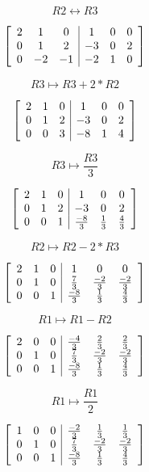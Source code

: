 \documentclass[lineaire_algebra_oplossingen.tex]{subfiles}
\begin{document}
\[R2 \leftrightarrow R3 \]

\[
\left[
\begin{array}{ c c c | c c c }
2 & 1 & 0 & 1 & 0 & 0\\
0 & 1 & 2 & -3 & 0 & 2\\
0 & -2 & -1 & -2 & 1 & 0
\end{array}
\right]
\]

\[R3 \mapsto R3 + 2*R2 \]

\[
\left[
\begin{array}{ c c c | c c c }
2 & 1 & 0 & 1 & 0 & 0\\
0 & 1 & 2 & -3 & 0 & 2\\
0 & 0 & 3 & -8 & 1 & 4
\end{array}
\right]
\]

\[R3 \mapsto \frac{R3}{3} \]

\[
\left[
\begin{array}{ c c c | c c c }
2 & 1 & 0 & 1 & 0 & 0\\
0 & 1 & 2 & -3 & 0 & 2\\
0 & 0 & 1 & \frac{-8}{3} & \frac{1}{3} & \frac{4}{3}
\end{array}
\right]
\]

\[R2 \mapsto R2 - 2*R3 \]

\[
\left[
\begin{array}{ c c c | c c c }
2 & 1 & 0 & 1 & 0 & 0\\
0 & 1 & 0 & \frac{7}{3} & \frac{-2}{3} & \frac{-2}{3}\\
0 & 0 & 1 & \frac{-8}{3} & \frac{1}{3} & \frac{4}{3}
\end{array}
\right]
\]

\[R1 \mapsto R1 - R2 \]

\[
\left[
\begin{array}{ c c c | c c c }
2 & 0 & 0 & \frac{-4}{3} & \frac{2}{3} & \frac{2}{3}\\
0 & 1 & 0 & \frac{7}{3} & \frac{-2}{3} & \frac{-2}{3}\\
0 & 0 & 1 & \frac{-8}{3} & \frac{1}{3} & \frac{4}{3}
\end{array}
\right]
\]

\[R1 \mapsto \frac{R1}{2}\]

\[
\left[
\begin{array}{ c c c | c c c }
1 & 0 & 0 & \frac{-2}{3} & \frac{1}{3} & \frac{1}{3}\\
0 & 1 & 0 & \frac{7}{3} & \frac{-2}{3} & \frac{-2}{3}\\
0 & 0 & 1 & \frac{-8}{3} & \frac{1}{3} & \frac{4}{3}
\end{array}
\right]
\]
\end{document}
